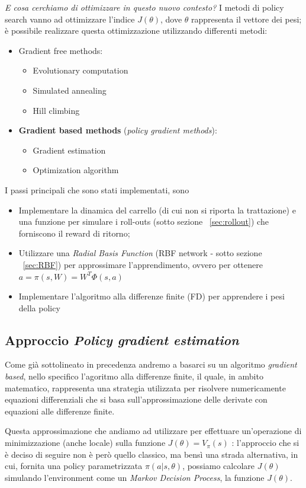 \textit{E cosa cerchiamo di ottimizzare in questo nuovo contesto?}
I metodi di policy search vanno ad ottimizzare l'indice $J(\theta)$, dove $\theta$ rappresenta il vettore dei pesi; è possibile realizzare questa ottimizzazione utilizzando differenti metodi:
\begin{itemize}
	\item Gradient free methods:
	\begin{itemize}
		\item Evolutionary computation
		\item Simulated annealing
		\item Hill climbing
	\end{itemize}
	\item \textbf{Gradient based methods} (\textit{policy gradient methods}):
	\begin{itemize}
		\item  Gradient estimation 
		\item Optimization algorithm
	\end{itemize}
\end{itemize}

I passi principali che sono stati implementati, sono
\begin{itemize}
	\item Implementare la dinamica del carrello (di cui non si riporta la trattazione) e una funzione per simulare i roll-outs (sotto sezione ~\ref{sec:rollout}) che forniscono il reward di ritorno;
	\item Utilizzare una \textit{Radial Basis Function} (RBF network - sotto sezione ~\ref{sec:RBF}) per approssimare l'apprendimento, ovvero per ottenere $a = \pi(s,W) = W^T\Phi(s,a)$
	\item Implementare l'algoritmo alla differenze finite (FD) per apprendere i pesi della policy
\end{itemize}

\subsection{Approccio \textit{Policy gradient estimation}}
Come già sottolineato in precedenza andremo a basarci su un algoritmo \textit{gradient based}, nello specifico l'agoritmo alla differenze finite, il quale, in ambito matematico, rappresenta una strategia utilizzata per risolvere numericamente equazioni differenziali che si basa sull'approssimazione delle derivate con equazioni alle differenze finite.

Questa approssimazione che andiamo ad utilizzare per effettuare un'operazione di minimizzazione (anche locale) sulla funzione $J(\theta) = V_\pi(s)$ \label{eq:J_function_to_minimize}: l'approccio che si è deciso di seguire non è però quello classico, ma bensì una strada alternativa, in cui, fornita una policy parametrizzata $\pi(a|s,\theta)$, possiamo calcolare $J(\theta)$ simulando l'environment come un \textit{Markov Decision Process}, la funzione $J(\theta)$. 

